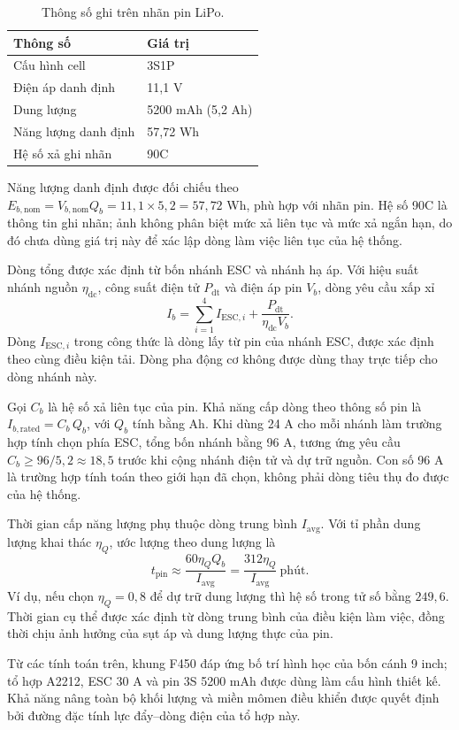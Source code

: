 \begin{table}[htbp]
	\centering
	\caption{Thông số ghi trên nhãn pin LiPo.}
	\label{tab:design-battery-specifications}
	\begin{tabularx}{\linewidth}{|C{4.2cm}|Y|}
		\hline
		\textbf{Thông số}    & \textbf{Giá trị}  \\
		\hline
		Cấu hình cell        & 3S1P              \\
		\hline
		Điện áp danh định    & 11,1 V            \\
		\hline
		Dung lượng           & 5200 mAh (5,2 Ah) \\
		\hline
		Năng lượng danh định & 57,72 Wh          \\
		\hline
		Hệ số xả ghi nhãn    & 90C               \\
		\hline
	\end{tabularx}
\end{table}

Năng lượng danh định được đối chiếu theo $E_{b,\mathrm{nom}}=V_{b,\mathrm{nom}}Q_b=11{,}1\times5{,}2=57{,}72$ Wh, phù hợp với nhãn pin. Hệ số 90C là thông tin ghi nhãn; ảnh không phân biệt mức xả liên tục và mức xả ngắn hạn, do đó chưa dùng giá trị này để xác lập dòng làm việc liên tục của hệ thống.

Dòng tổng được xác định từ bốn nhánh ESC và nhánh hạ áp. Với hiệu suất nhánh nguồn $\eta_{\mathrm{dc}}$, công suất điện tử $P_{\mathrm{dt}}$ và điện áp pin $V_b$, dòng yêu cầu xấp xỉ
\begin{equation}
	I_b=\sum_{i=1}^{4}I_{\mathrm{ESC},i}
	+\frac{P_{\mathrm{dt}}}{\eta_{\mathrm{dc}}V_b}.
	\label{eq:design-battery-current}
\end{equation}
Dòng $I_{\mathrm{ESC},i}$ trong công thức là dòng lấy từ pin của nhánh ESC, được xác định theo cùng điều kiện tải. Dòng pha động cơ không được dùng thay trực tiếp cho dòng nhánh này.

Gọi $C_b$ là hệ số xả liên tục của pin. Khả năng cấp dòng theo thông số pin là $I_{b,\mathrm{rated}}=C_b\,Q_b$, với $Q_b$ tính bằng Ah. Khi dùng 24 A cho mỗi nhánh làm trường hợp tính chọn phía ESC, tổng bốn nhánh bằng 96 A, tương ứng yêu cầu $C_b\geq96/5{,}2\approx18{,}5$ trước khi cộng nhánh điện tử và dự trữ nguồn. Con số 96 A là trường hợp tính toán theo giới hạn đã chọn, không phải dòng tiêu thụ đo được của hệ thống.

Thời gian cấp năng lượng phụ thuộc dòng trung bình $I_{\mathrm{avg}}$. Với tỉ phần dung lượng khai thác $\eta_Q$, ước lượng theo dung lượng là
\begin{equation}
	t_{\mathrm{pin}}\approx
	\frac{60\eta_Q Q_b}{I_{\mathrm{avg}}}
	=\frac{312\eta_Q}{I_{\mathrm{avg}}}\ \text{phút}.
	\label{eq:design-battery-duration}
\end{equation}
Ví dụ, nếu chọn $\eta_Q=0{,}8$ để dự trữ dung lượng thì hệ số trong tử số bằng $249{,}6$. Thời gian cụ thể được xác định từ dòng trung bình của điều kiện làm việc, đồng thời chịu ảnh hưởng của sụt áp và dung lượng thực của pin.

Từ các tính toán trên, khung F450 đáp ứng bố trí hình học của bốn cánh 9 inch; tổ hợp A2212, ESC 30 A và pin 3S 5200 mAh được dùng làm cấu hình thiết kế. Khả năng nâng toàn bộ khối lượng và miền mômen điều khiển được quyết định bởi đường đặc tính lực đẩy--dòng điện của tổ hợp này.
